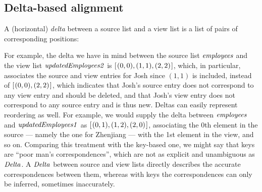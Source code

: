 \subsection{Delta-based alignment}

A (horizontal) \emph{delta} between a source list and a view list is a list of pairs of corresponding positions:
\resethooks
For example, the delta we have in mind between the source list \ensuremath{\Varid{employees}} and the view list \ensuremath{\Varid{updatedEmployees2}} is \ensuremath{[\mskip1.5mu (\mathrm{0},\mathrm{0}),(\mathrm{1},\mathrm{1}),(\mathrm{2},\mathrm{2})\mskip1.5mu]}, which, in particular, associates the source and view entries for Josh since \ensuremath{(\mathrm{1},\mathrm{1})} is included, instead of \ensuremath{[\mskip1.5mu (\mathrm{0},\mathrm{0}),(\mathrm{2},\mathrm{2})\mskip1.5mu]}, which indicates that Josh's source entry does not correspond to any view entry and should be deleted, and that Josh's view entry does not correspond to any source entry and is thus new.
Deltas can easily represent reordering as well.
For example, we would supply the delta between \ensuremath{\Varid{employees}} and \ensuremath{\Varid{updatedEmployees1}} as \ensuremath{[\mskip1.5mu (\mathrm{0},\mathrm{1}),(\mathrm{1},\mathrm{2}),(\mathrm{2},\mathrm{0})\mskip1.5mu]}, associating the 0th element in the source --- namely the one for Zhenjiang --- with the 1st element in the view, and so on.
Comparing this treatment with the key-based one, we might say that keys are ``poor man's correspondences'', which are not as explicit and unambiguous as \ensuremath{\Conid{Delta}}.
A \ensuremath{\Conid{Delta}} between source and view lists directly describes the accurate correspondences between them, whereas with keys the correspondences can only be inferred, sometimes inaccurately.

